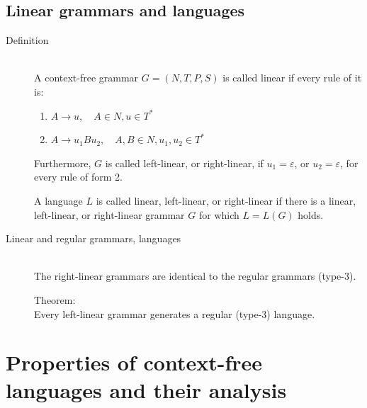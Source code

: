 \documentclass[margin=0px]{article}
\begin{document}
\subsection{Linear grammars and languages}
\begin{description}
    \item[Definition] \hfill \\
        A context-free grammar $G=(N,T,P,S)$ is called linear if every rule of it is:
        \begin{enumerate}
            \item $A\rightarrow u, \quad A \in N, u \in T^*$
            \item $A\rightarrow u_1Bu_2, \quad A,B\in N, u_1,u_2 \in T^*$
        \end{enumerate}
        Furthermore, $G$ is called left-linear, or right-linear, if $u_1 = \varepsilon$, or $u_2 = \varepsilon$, for every rule of form 2.

        A language $L$ is called linear, left-linear, or right-linear if there is a linear, left-linear, or right-linear grammar $G$ for which $L = L(G)$ holds.
    \item[Linear and regular grammars, languages] \hfill \\
        The right-linear grammars are identical to the regular grammars (type-3).

        Theorem: \\
        Every left-linear grammar generates a regular (type-3) language.
\end{description}
\section{Properties of context-free languages and their analysis}
\end{document}

